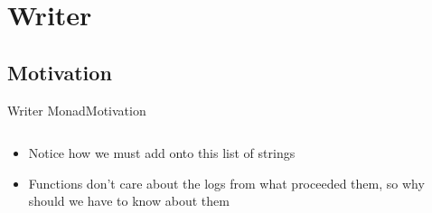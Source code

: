 \section{Writer}
\subsection{Motivation}
\begin{frame}[fragile]{Writer Monad}{Motivation}
  {\tiny\inputminted[escapeinside=||,breakafter=\$]{haskell}{writer-motivation.hs}}
  \begin{itemize}
    \item Notice how we must add onto this list of strings
    \item Functions don't care about the logs from what proceeded them, so why should we have to know about them
  \end{itemize}
\end{frame}
